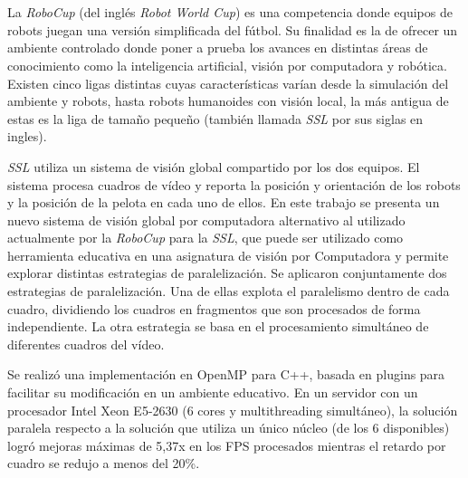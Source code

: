 \ \\
\ \\
\label{pagresum}
\\
\ \\
\ \\

\ \\

\ \\

La \emph{RoboCup} (del inglés \emph{Robot World Cup}) es una competencia donde
equipos de robots juegan una versión simplificada del fútbol. Su finalidad es
la de ofrecer un ambiente controlado donde poner a prueba los avances en
distintas áreas de conocimiento como la inteligencia artificial, visión por
computadora y robótica. Existen cinco ligas distintas cuyas características
varían desde la simulación del ambiente y robots, hasta robots humanoides con
visión local, la más antigua de estas es la liga de tamaño pequeño (también
llamada \emph{SSL} por sus siglas en ingles).

\emph{SSL} utiliza un sistema de visión global compartido por los dos equipos.
El sistema procesa cuadros de vídeo y reporta la posición y orientación de los
robots y la posición de la pelota en cada uno de ellos. En este trabajo se
presenta un nuevo sistema de visión global por computadora alternativo al
utilizado actualmente por la \emph{RoboCup} para la \emph{SSL}, que puede ser
utilizado como herramienta educativa en una asignatura de visión por
Computadora y permite explorar distintas estrategias de paralelización. Se
aplicaron conjuntamente dos estrategias de paralelización. Una de ellas
explota el paralelismo dentro de cada cuadro, dividiendo los cuadros en
fragmentos que son procesados de forma independiente. La otra estrategia se
basa en el procesamiento simultáneo de diferentes cuadros del vídeo.

Se realizó una implementación en OpenMP para C++, basada en plugins para
facilitar su modificación en un ambiente educativo. En un servidor con un
procesador Intel Xeon E5-2630 (6 cores y multithreading simultáneo), la
solución paralela respecto a la solución que utiliza un único núcleo (de los 6
disponibles) logró mejoras máximas de 5,37x en los FPS procesados mientras el
retardo por cuadro se redujo a menos del 20\%.

\vfill
\pagebreak
